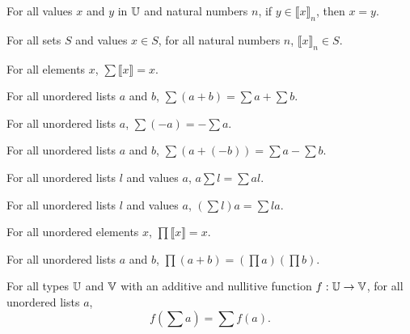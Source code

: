 \documentclass[../../math.tex]{subfiles}
\begin{document}
\begin{theorem} \label{in_ulist_constant}
    For all values $x$ and $y$ in $\mathbb{U}$ and natural numbers $n$, if $y \in
    \llbracket x\rrbracket_n$, then $x = y$.
\end{theorem}

\begin{theorem} \label{ulist_prop_constant}
    For all sets $S$ and values $x \in S$, for all natural numbers $n$,
    $\llbracket x \rrbracket_n \in S$.
\end{theorem}

\begin{theorem}
    For all elements $x$, $\sum \llbracket x\rrbracket = x$.
\end{theorem}

\begin{theorem} \label{ulist_sum_conc}
    For all unordered lists $a$ and $b$, $\sum (a + b) = \sum a + \sum b$.
\end{theorem}

\begin{theorem} \label{ulist_sum_neg}
    For all unordered lists $a$, $\sum (-a) = -\sum a$.
\end{theorem}

\begin{theorem} \label{ulist_sum_minus}
    For all unordered lists $a$ and $b$, $\sum (a + (-b)) = \sum a - \sum b$.
\end{theorem}

\begin{theorem} \label{ulist_sum_lmult}
    For all unordered lists $l$ and values $a$, $a\sum l = \sum al$.
\end{theorem}

\begin{theorem} \label{ulist_sum_rmult}
    For all unordered lists $l$ and values $a$, $\left( \sum l \right) a = \sum
    la$.
\end{theorem}

\begin{theorem}
    For all unordered elements $x$, $\prod \llbracket x\rrbracket = x$.
\end{theorem}

\begin{theorem} \label{ulist_prod_conc}
    For all unordered lists $a$ and $b$, $\prod (a + b) = (\prod a) (\prod b)$.
\end{theorem}

\begin{theorem} \label{ulist_sum_homo}
    For all types $\mathbb{U}$ and $\mathbb{V}$ with an additive and nullitive function $f : \mathbb{U}
    \to \mathbb{V}$, for all unordered lists $a$,
    \[
        f\left( \sum a \right) = \sum f(a).
    \]
\end{theorem}
\end{document}
